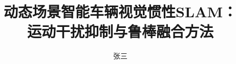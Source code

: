 \documentclass[doctor]{hnuthesis}
\title{动态场景智能车辆视觉惯性SLAM：\\运动干扰抑制与鲁棒融合方法}
\author{张三}
\begin{document}
\maketitle


\tableofcontents
\begingroup
\renewcommand*{\addvspace}[1]{}
\newcommand{\loflabel}{图}
\renewcommand{\numberline}[1]{\loflabel~#1\hspace*{1em}}
\listoffigures

\newcommand{\lotlabel}{表}
\renewcommand{\numberline}[1]{\lotlabel~#1\hspace*{1em}}
\listoftables
\endgroup
\let\cleardoublepage\clearpage

\mainmatter
%




\appendix
% 
% 

\backmatter



% 



\end{document}
